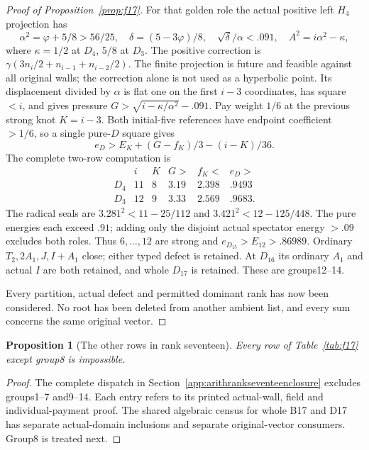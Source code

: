 \documentclass[11pt]{article}
\newtheorem{proposition}[theorem]{Proposition}
\begin{document}
\begin{proof}[Proof of Proposition~\ref{prop:f17}]
For that golden role the actual positive left $H_4$ projection has
\[
 \alpha^2=\varphi+5/8>56/25,\quad
 \delta=(5-3\varphi)/8,\quad \sqrt\delta/\alpha<.091,
 \quad A^2=i\alpha^2-\kappa,
\]
where $\kappa=1/2$ at $D_4$, $5/8$ at $D_3$.
The positive correction is
$\gamma(3n_i/2+n_{i-1}+n_{i-2}/2)$.
The finite projection is future and feasible against all original
walls; the correction alone is not used as a hyperbolic point.
Its displacement divided by $\alpha$ is flat one on the first
$i-3$ coordinates, has square $<i$, and gives pressure
$G>\sqrt{i-\kappa/\alpha^2}-.091$.
Pay weight $1/6$ at the previous strong knot $K=i-3$.
Both initial-five references have endpoint coefficient $>1/6$,
so a single pure-$D$ square gives
\[
 e_D>E_K+(G-f_K)/3-(i-K)/36.
\]
The complete two-row computation is
\[
\begin{array}{c|rrrr|c}
 &i&K&G>&f_K<&e_D>\\\hline
D_4&11&8&3.19&2.398&.9493\\
D_3&12&9&3.33&2.569&.9683.
\end{array}
\]
The radical seals are $3.281^2<11-25/112$ and
$3.421^2<12-125/448$. The pure energies each exceed $.91$;
adding only the disjoint actual spectator energy $>.09$ excludes
both roles. Thus $6,\ldots,12$ are strong and
$e_{D_{15}}>E_{12}>.86989$.
Ordinary $T_2,2A_1,J,I+A_1$ close; either typed defect is retained.
At $D_{16}$ its ordinary $A_1$ and actual $I$ are both retained,
and whole $D_{17}$ is retained. These are groups12--14.

Every partition, actual defect and permitted dominant rank has now
been considered. No root has been deleted from another ambient list,
and every sum concerns the same original vector.
\end{proof}

\begin{proposition}[The other rows in rank seventeen]\label{prop:old17}
Every row of Table~\ref{tab:f17} except group8 is impossible.
\end{proposition}
\begin{proof}
The complete dispatch in Section~\ref{app:arithrankseventeenclosure}
excludes groups1--7 and9--14. Each entry refers to its printed actual-wall,
field and individual-payment proof. The shared algebraic census for
whole B17 and D17 has separate actual-domain inclusions and separate
original-vector consumers. Group8 is treated next.
\end{proof}
\end{document}
